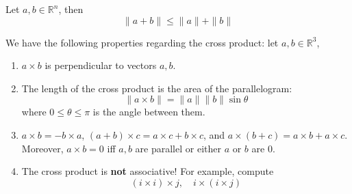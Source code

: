 \documentclass[openany]{book}
\newcommand{\R}{\mathbb{R}}
\begin{document}
\begin{prop}\label{traingle}
    Let $a,b\in\R^n$, then 
    \begin{equation*}
        \|a+b\|\leq\|a\|+\|b\|
    \end{equation*}
\end{prop}



\begin{prop}
    We have the following properties regarding the cross product: let $a,b\in\R^3$,
    \begin{enumerate}
        \item $a\times b$ is perpendicular to vectors $a,b$.
        \item The length of the cross product is the area of the parallelogram:
        \begin{equation*}
            \|a\times b\|=\|a\|\|b\|\sin\theta
        \end{equation*}
        where $0\leq\theta\leq\pi$ is the angle between them. 
        \item $a\times b=-b\times a$, $(a+b)\times c=a\times c+b\times c$, and $a\times (b+c)=a\times b+a\times c$. Moreover, $a\times b=0$ iff $a,b$ are parallel or either $a$ or $b$ are $0$.
        \item The cross product is \textbf{not} associative! For example, compute 
        \begin{equation*}
            (i\times i)\times j, \quad i\times (i\times j)
        \end{equation*}
    \end{enumerate}
\end{prop}
\end{document}
